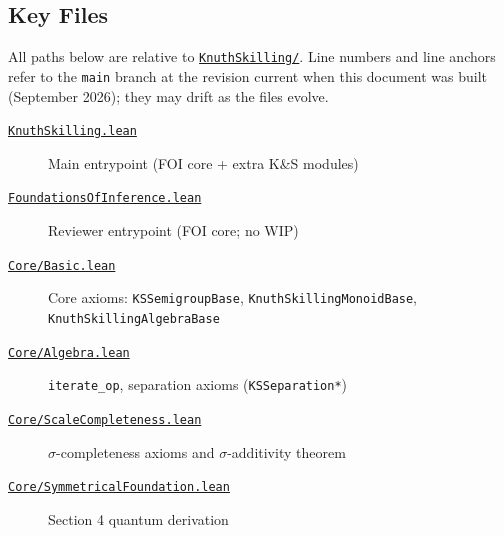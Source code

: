 \documentclass[11pt]{article}
\theoremstyle{definition}
\theoremstyle{remark}
\begin{document}
\subsection{Key Files}

All paths below are relative to \href{https://github.com/zariuq/ks-foundations-of-inference/tree/main/KnuthSkilling/}{\texttt{KnuthSkilling/}}.
Line numbers and line anchors refer to the \texttt{main} branch at the revision current when this document was
built (September 2026); they may drift as the files evolve.

\begin{description}
\item[\href{https://github.com/zariuq/ks-foundations-of-inference/blob/main/KnuthSkilling.lean}{\texttt{KnuthSkilling.lean}}] Main entrypoint (FOI core + extra K\&S modules)
\item[\href{https://github.com/zariuq/ks-foundations-of-inference/blob/main/KnuthSkilling/FoundationsOfInference.lean}{\texttt{FoundationsOfInference.lean}}] Reviewer entrypoint (FOI core; no WIP)

\medskip
\item[\href{https://github.com/zariuq/ks-foundations-of-inference/blob/main/KnuthSkilling/Core/Basic.lean}{\texttt{Core/Basic.lean}}] Core axioms: \texttt{KSSemigroupBase}, \texttt{KnuthSkillingMonoidBase},\\
      \texttt{KnuthSkillingAlgebraBase}
\item[\href{https://github.com/zariuq/ks-foundations-of-inference/blob/main/KnuthSkilling/Core/Algebra.lean}{\texttt{Core/Algebra.lean}}] \texttt{iterate\_op}, separation axioms (\texttt{KSSeparation*})
\item[\href{https://github.com/zariuq/ks-foundations-of-inference/blob/main/KnuthSkilling/Core/ScaleCompleteness.lean}{\texttt{Core/ScaleCompleteness.lean}}] $\sigma$-completeness axioms and $\sigma$-additivity theorem
\item[\href{https://github.com/zariuq/ks-foundations-of-inference/blob/main/KnuthSkilling/Core/SymmetricalFoundation.lean}{\texttt{Core/SymmetricalFoundation.lean}}] Section 4 quantum derivation


\end{description}
\end{document}
